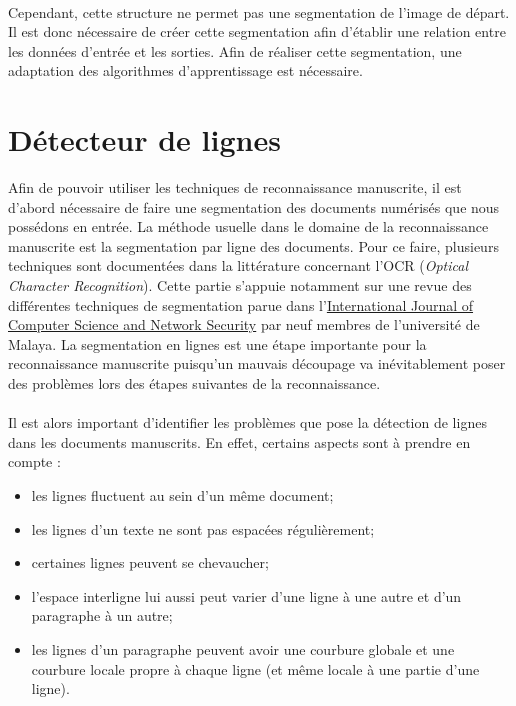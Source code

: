\paragraph{}
Cependant, cette structure ne permet pas une segmentation de l'image de départ. Il est donc nécessaire de créer
cette segmentation afin d'établir une relation entre les données d'entrée et les sorties. Afin de réaliser cette
segmentation, une adaptation des algorithmes d'apprentissage est nécessaire.

\section{Détecteur de lignes}

Afin de pouvoir utiliser les techniques de reconnaissance manuscrite, il est d'abord nécessaire
de faire une segmentation des documents numérisés que nous possédons en entrée. La méthode
usuelle dans le domaine de la reconnaissance manuscrite est la segmentation par ligne des documents.
Pour ce faire, plusieurs techniques sont documentées dans la littérature concernant l'OCR
(\textit{Optical Character Recognition}). Cette partie s'appuie notamment sur une revue des différentes
techniques de segmentation parue dans l’\href{http://www.ijcsns.org/}{International Journal of Computer Science and Network Security}
par neuf membres de l’université de Malaya. La segmentation en lignes est une étape importante pour
la reconnaissance manuscrite puisqu'un mauvais découpage va inévitablement poser des problèmes
lors des étapes suivantes de la reconnaissance.

\paragraph{}
Il est alors important d'identifier les problèmes que pose la détection de lignes dans les documents manuscrits.
En effet, certains aspects sont à prendre en compte :
\begin{itemize}
\item les lignes fluctuent au sein d'un même document;
\item les lignes d'un texte ne sont pas espacées régulièrement;
\item certaines lignes peuvent se chevaucher;
\item l'espace interligne lui aussi peut varier d'une ligne à une autre et d'un paragraphe à un autre;
\item les lignes d'un paragraphe peuvent avoir une courbure globale et une courbure locale propre à
chaque ligne (et même locale à une partie d'une ligne).
\end{itemize}

